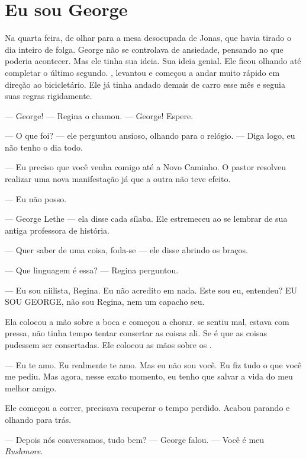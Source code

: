 \chapter{Eu sou George}

Na quarta feira,  de olhar para a mesa desocupada de Jonas, que havia tirado o dia inteiro de folga. George não se controlava de ansiedade, pensando no que poderia acontecer. Mas ele tinha sua ideia. Sua ideia genial. Ele ficou olhando até completar o último segundo. ,  levantou e começou a andar muito rápido em direção ao bicicletário. Ele já tinha andado demais de carro esse mês e seguia suas regras rigidamente.

--- George! --- Regina o chamou. --- George! Espere.

--- O que foi? --- ele perguntou\mudanca{,} ansioso, olhando para o relógio. --- Diga logo, eu não tenho o dia todo.

--- Eu preciso que você venha comigo até a Novo Caminho. O pastor resolveu realizar uma nova manifestação\mudanca{,} já que a outra não teve efeito.

--- Eu não posso.

--- George Lethe --- ela disse cada sílaba. Ele estremeceu ao se lembrar de sua antiga professora de história.

--- Quer saber de uma coisa, foda-se --- ele disse\mudanca{,} abrindo os braços.

--- Que linguagem é essa? --- Regina perguntou.

--- Eu sou niilista, Regina. Eu não acredito em nada. Este sou eu, entendeu? EU SOU GEORGE, não sou Regina, nem um capacho seu.

Ela colocou a mão sobre a boca e começou a chorar.  se sentiu mal, estava com pressa, não tinha tempo  tentar consertar as coisas ali. Se é que as coisas pudessem ser consertadas. Ele colocou as mãos sobre os .

--- Eu te amo. Eu realmente te amo. Mas eu não sou você. Eu fiz tudo o que você me pediu. Mas agora, nesse exato momento, eu tenho que salvar a vida do meu melhor amigo.

Ele começou a correr, precisava recuperar o tempo perdido. Acabou parando e olhando para trás.

--- Depois nós conversamos, tudo bem? --- George falou. --- Você é meu \foreignlanguage{english}{\emph{Rushmore}}.

